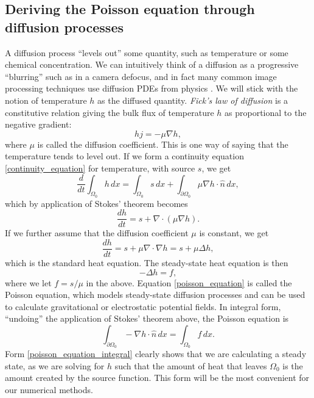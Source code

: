 \documentclass[11pt,a4paper]{memoir}
\newcommand{\omn}{{\Omega_0}}
\newcommand{\pomn}{{\partial\Omega_0}}
\begin{document}
\subsection{Deriving the Poisson equation through diffusion processes}
A diffusion process ``levels out'' some quantity, such as temperature or some chemical concentration. We can intuitively think of a diffusion as a
progressive ``blurring''
such as in a camera defocus, and in fact many common image processing techniques use diffusion PDEs from physics \cite{tum}. We will stick with
the notion of temperature $h$ as the diffused quantity.
\textit{Fick's law of diffusion} is a constitutive relation giving the bulk flux of temperature $h$ as proportional to the negative gradient:
    $$hj = -\mu\nabla h,$$
where $\mu$ is called the diffusion coefficient.
This is one way of saying that the temperature tends to level out.
If we form a continuity equation \eqref{continuity_equation} for temperature, with source $s$, we get
\begin{equation}\label{heat_equation_integral}
    \frac{d}{dt} \int_{\Omega_0} h\,dx = \int_{\Omega_0} s\,dx + \int_{\pomn} \mu \nabla h \cdot \hat{n}\,dx,
\end{equation}
which by application of Stokes' theorem becomes
\begin{equation}\label{heat_equation_differential}
    \frac{dh}{dt} = s + \nabla \cdot \left(\mu \nabla h\right).
\end{equation}
If we further assume that the diffusion coefficient $\mu$ is constant, we get
\begin{equation}\label{heat_equation_differential_constant}
    \frac{dh}{dt} = s + \mu\nabla \cdot \nabla h = s + \mu\Delta h,
\end{equation}
which is the standard heat equation.
The steady-state heat equation is then
\begin{equation}\label{poisson_equation}
    -\Delta h = f,
\end{equation}
where we let $f = s/\mu$ in the above. Equation \eqref{poisson_equation} is called the Poisson equation,
which models steady-state diffusion processes and can be used to calculate gravitational or electrostatic potential fields.
In integral form, ``undoing'' the application of Stokes' theorem above, the Poisson equation is
\begin{equation}\label{poisson_equation_integral}
    \int_{\pomn} -\nabla h\cdot \hat{n}\,dx = \int_{\omn} f\,dx.
\end{equation}
Form \eqref{poisson_equation_integral} clearly shows that we are calculating a steady state,
as we are solving for $h$ such that the amount of heat that leaves $\Omega_0$ is the amount created by the source function.
This form will be the most convenient for our numerical methods.
\end{document}
